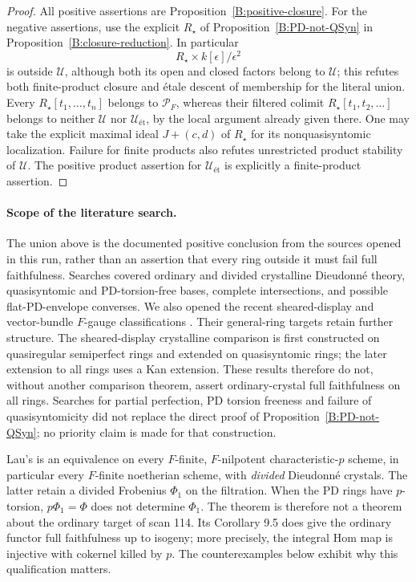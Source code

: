 \begin{proof}
All positive assertions are
Proposition~\ref{B:positive-closure}. For the negative assertions,
use the explicit $R_\star$ of Proposition~\ref{B:PD-not-QSyn}
in Proposition~\ref{B:closure-reduction}. In particular
\[
 R_\star\times k[\epsilon]/\epsilon^2
\]
is outside $\mathcal U$, although both its open and closed
factors belong to $\mathcal U$; this refutes both finite-product
closure and \'etale descent of membership for the literal union.
Every $R_\star[t_1,\ldots,t_n]$ belongs to $\mathcal P_F$, whereas
their filtered colimit $R_\star[t_1,t_2,\ldots]$ belongs to neither
$\mathcal U$ nor $\mathcal U_{\text{ét}}$, by the local argument
already given there. One may take the explicit maximal ideal
$J+(c,d)$ of $R_\star$ for its nonquasisyntomic localization.
Failure for finite products also refutes unrestricted product
stability of $\mathcal U$. The positive product assertion for
$\mathcal U_{\text{ét}}$ is explicitly a finite-product assertion.
\end{proof}

\paragraph{Scope of the literature search.}
The union above is the documented positive conclusion from the
sources opened in this run, rather than an assertion that every
ring outside it must fail full faithfulness. Searches covered
ordinary and divided crystalline Dieudonn\'e theory,
quasisyntomic and PD-torsion-free bases, complete intersections,
and possible flat-PD-envelope converses. We also opened the
recent sheared-display and vector-bundle $F$-gauge classifications
\cite{B:HoffLauSheared,B:GardnerMadapusi}. Their general-ring
targets retain further structure. The sheared-display crystalline
comparison is first constructed on quasiregular semiperfect
rings and extended on quasisyntomic rings; the later extension
to all rings uses a Kan extension. These results therefore do
not, without another comparison theorem, assert ordinary-crystal
full faithfulness on all rings. Searches for partial
perfection, PD torsion freeness and failure of quasisyntomicity
did not replace the direct proof of
Proposition~\ref{B:PD-not-QSyn}; no priority claim is made for
that construction.

\begin{remark}
\label{B:divided-target}
Lau's \cite[Theorem 9.3]{B:LauDivided} is an equivalence on every
$F$-finite, $F$-nilpotent characteristic-$p$ scheme, in particular
every $F$-finite noetherian scheme, with \emph{divided} Dieudonn\'e
crystals. The latter retain a divided Frobenius $\Phi_1$ on the
filtration. When the PD rings have $p$-torsion, $p\Phi_1=\Phi$ does
not determine $\Phi_1$. The theorem is therefore not a theorem about
the ordinary target of scan 114. Its Corollary 9.5 does give the
ordinary functor full faithfulness up to isogeny; more precisely,
the integral Hom map is injective with cokernel killed by $p$.
The counterexamples below exhibit why this qualification matters.
\end{remark}

